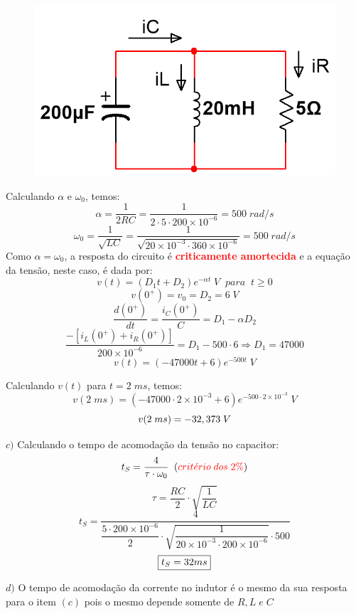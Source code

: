 \documentclass[
	12pt,				%
	oneside,			%
	a4paper,			%
	english,			%
	french,				%
	spanish,			%
	brazil				%
	]{abntex2}
\begin{document}
\begin{figure}[htb]
	\centering
	\includegraphics[scale=0.35]{Circuitos_2-28.PNG}
\end{figure}

Calculando $\alpha$ e $\omega_0$, temos:
$$\alpha = \dfrac{1}{2RC} = \dfrac{1}{2\cdot5\cdot200\times10^{-6}} = 500 \;rad/s$$
$$\omega_0 = \dfrac{1}{\sqrt{LC}} = \dfrac{1}{\sqrt{20\times10^{-3}\cdot360\times10^{-6}}} = 500 \;rad/s$$
\newpage
Como $\alpha=\omega_0$, a resposta do circuito é \textbf{\textcolor{red}{criticamente amortecida}} e a equação da tensão, neste caso, é dada por:
$$v(t) = (D_1t+D_2)e^{-\alpha t} \; V \;\; para \;\; t\geq0$$
$$v(0^+) = v_0 = D_2 = 6\;V$$
$$\dfrac{d(0^+)}{dt} = \dfrac{i_C(0^+)}{C} = D_1 - \alpha D_2$$
$$\dfrac{-[i_L(0^+)+i_R(0^+)]}{200\times10^{-6}} = D_1 - 500\cdot6 \Longrightarrow D_1 = 47000$$
$$v(t) = (-47000t + 6)e^{-500t}\;V$$

Calculando $v(t)$ para $t=2\;ms$, temos:
$$v(2\;ms) = (-47000\cdot2\times10^{-3} + 6)e^{-500\cdot2\times10^{-3}} \;V$$
\begin{equation}
    \centering
    v(2\;ms) = -32,373\;V
\end{equation}

$c)$ Calculando o tempo de acomodação da tensão no capacitor:
$$t_S = \dfrac{4}{\tau \cdot \omega_0}\;\;(\textcolor{red}{crit\acute{e}rio\;dos\;2\%})$$
$$\tau = \dfrac{RC}{2} \cdot \sqrt{\dfrac{1}{LC}}$$
$$t_S = \dfrac{4}{\dfrac{5\cdot 200\times10^{-6}}{2} \cdot \sqrt{\dfrac{1}{20\times10^{-3}\cdot200\times10^{-6}}} \cdot 500}$$
\begin{equation}
    \centering
    \fbox{$t_S = 32 ms$}
\end{equation}

$d)$ O tempo de acomodação da corrente no indutor é o mesmo da sua resposta para o item $(c)$ pois o mesmo depende somente de $R,L\;e\;C$
\end{document}
